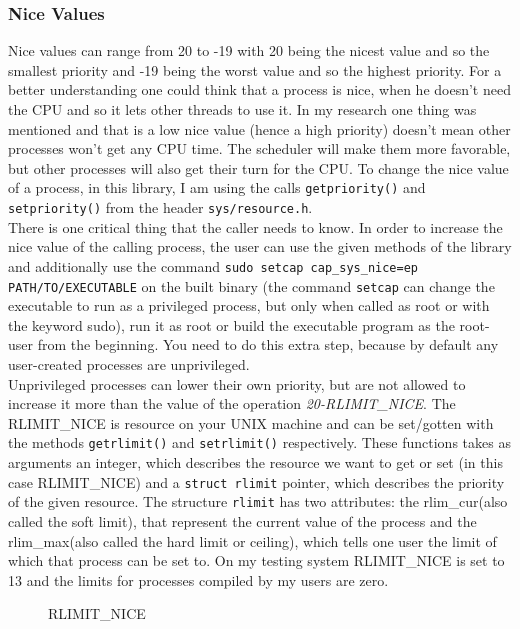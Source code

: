 \subsubsection{Nice Values}
Nice values can range from 20 to
-19 with 20 being the nicest value and so the smallest priority and -19 being the worst value and so
the highest priority. For a better understanding one could think that a process is nice, when he doesn't need
the CPU and so it lets other threads to use it. In my research one thing was mentioned and that is a low nice value (hence a high priority) doesn't mean other processes won't get any CPU
time. The scheduler will make them more favorable, but other processes will also get their turn for the
CPU.
To change the nice value of a process, in this library, I am using
the calls \texttt{getpriority()} and \texttt{setpriority()} from the header \texttt{sys/resource.h}.\\
There is one
critical thing that the caller needs to know. In order to increase the nice value of the calling
process, the user can use the given methods of the library and additionally use the command
\texttt{sudo setcap cap\_sys\_nice=ep PATH/TO/EXECUTABLE} on the built binary (the command \texttt{setcap} can change the executable to
run as a privileged process, but only when called as root or with the keyword sudo), run it as root or build the executable
program as the root-user from the beginning. You need to do this extra step,
because by default any user-created processes are unprivileged.\\
Unprivileged processes can lower their own
priority, but are not allowed to increase it more than the value of the operation
\textit{20-RLIMIT\_NICE}. The RLIMIT\_NICE is resource on your UNIX machine and can be set/gotten with the methods \texttt{getrlimit()} and \texttt{setrlimit()} respectively. These functions takes as arguments an integer, which describes the resource we want to get or set (in this case RLIMIT\_NICE) and a \texttt{struct rlimit} pointer, which describes the priority of the given resource. The structure \texttt{rlimit} has two attributes: the \dq rlim\_cur\dq{}(also called the soft limit), that represent the current value of the process and the \dq rlim\_max\dq{}(also called the hard limit or ceiling), which tells one user the limit of which that process can be set to. On my testing system
RLIMIT\_NICE is set to 13 and the limits for processes compiled by my users are zero.
\begin{figure*}[!htb]
	\centering
	\caption{RLIMIT\_NICE} 
	\label{RLIMIT_NICE}
\end{figure*}
